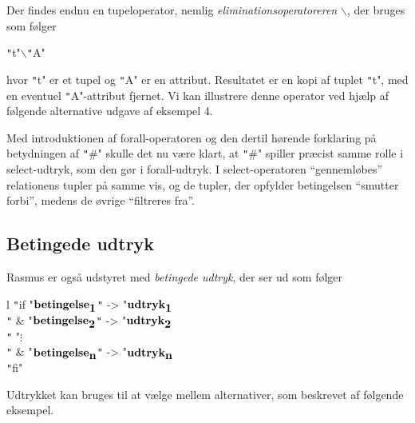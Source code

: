 \documentclass{article}
\newcounter{eks}
\begin{document}
Der findes endnu en tupeloperator, nemlig {\em eliminationsoperatoreren\/}
$\backslash$, der bruges som f\o{}lger
\begin{center}
\texttt"t"$\backslash$\texttt"A"
\end{center}
hvor \texttt"t" er et tupel og \texttt"A" er en attribut. Resultatet er
en kopi af tuplet \texttt"t", med en eventuel \texttt"A"-attribut fjernet.
Vi kan illustrere denne operator ved hj\ae{}lp af f\o{}lgende alternative
udgave af eksempel 4.


Med introduktionen af forall-operatoren og den dertil h\o{}rende
forklaring p\aa{} betydningen af \texttt"#" skulle det nu v\ae{}re
klart, at \texttt"#" spiller pr\ae{}cist samme rolle i select-udtryk,
som den g\o{}r i forall-udtryk. I select-operatoren ``genneml\o{}bes''
relationens tupler p\aa{} samme vis, og de tupler, der opfylder
betingelsen ``smutter forbi'', medens de \o{}vrige ``filtreres fra''.

\subsection{Betingede udtryk}
{\sc Rasmus} er ogs\aa{} udstyret med {\em betingede udtryk}, der ser
ud som f\o{}lger
\begin{center}
\begin{tabular}{l}
\texttt"if "$\mbox{\bf betingelse}_{\mbox{\bf 1}}$\texttt" -> "$\mbox{\bf udtryk}_{\mbox{\bf 1}}$\\
\texttt" & "$\mbox{\bf betingelse}_{\mbox{\bf 2}}$\texttt" -> "$\mbox{\bf udtryk}_{\mbox{\bf 2}}$\\
\texttt" "$\vdots$\\
\texttt" & "$\mbox{\bf betingelse}_{\mbox{\bf n}}$\texttt" -> "$\mbox{\bf udtryk}_{\mbox{\bf n}}$\\
\texttt"fi"
\end{tabular}
\end{center}
Udtrykket kan bruges til at v\ae{}lge mellem alternativer, som
beskrevet af f\o{}lgende eksempel.
\end{document}
